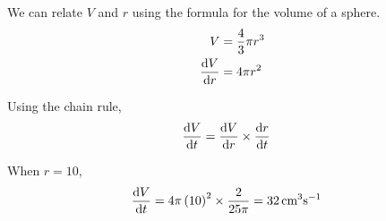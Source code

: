 \documentclass[11pt,a4paper]{book}
\begin{document}
\begin{example}
\begin{tasks}[label=(\alph*),label-width=3.5ex]
We can relate $V$ and $r$ using the formula for the volume of a
sphere.
\begin{align*}
V & =\frac{4}{3}\pi r^{3}\\
\frac{{\rm d}V}{{\rm d}r} & =4\pi r^{2}
\end{align*}

Using the chain rule,
\begin{align*}
\frac{{\rm d}V}{{\rm d}t} & =\frac{{\rm d}V}{{\rm d}r}\times\frac{{\rm d}r}{{\rm d}t}
\end{align*}

When $r=10$,
\begin{align*}
\frac{{\rm d}V}{{\rm d}t} & =4\pi\left(10\right)^{2}\times\frac{2}{25\pi}=32\,\text{cm}^{3}\text{s}^{-1}
\end{align*}

\end{tasks}

\end{example}

\newpage
\end{document}
